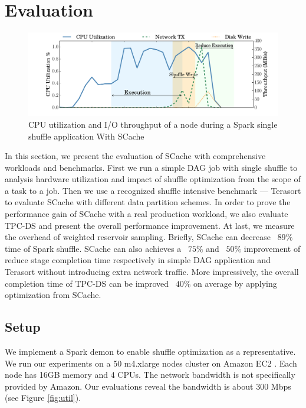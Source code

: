 \section{Evaluation}\label{evaluation}
\begin{figure}
	\includegraphics[width=\linewidth]{fig/scache_util}
	\caption{CPU utilization and I/O throughput of a node during a Spark single shuffle application With SCache}
	\label{fig:scache_util}
\end{figure}
In this section, we present the evaluation of SCache with comprehensive workloads and benchmarks. First we run a simple DAG job with single shuffle to analysis hardware utilization and impact of shuffle optimization from the scope of a task to a job. 
Then we use a recognized shuffle intensive benchmark --- Terasort \cite{spark-tera} to evaluate SCache with different data partition schemes.
In order to prove the performance gain of SCache with a real production workload, we also evaluate TPC-DS \cite{sparktpcds} and present the overall performance improvement.
At last, we measure the overhead of weighted reservoir sampling. 
Briefly, SCache can decrease ~$89\%$ time of Spark shuffle. SCache can also achieves a ~$75\%$ and ~$50\%$ improvement of reduce stage completion time respectively in simple DAG application and Terasort without introducing extra network traffic. More impressively, the overall completion time of TPC-DS can be improved ~$40\%$ on average by applying optimization from SCache.

\subsection{Setup}\label{stepup}
We implement a Spark demon to enable shuffle optimization as a representative.
We run our experiments on a 50 m4.xlarge nodes cluster on Amazon EC2 \cite{aws}. Each node has 16GB memory and 4 CPUs. The network bandwidth is not specifically provided by Amazon. Our evaluations reveal the bandwidth is about 300 Mbps (see Figure \ref{fig:util}).

